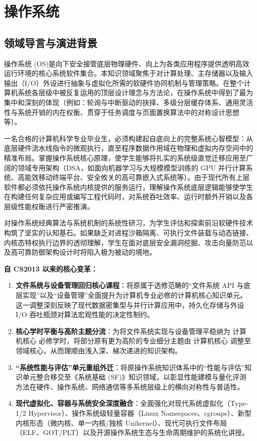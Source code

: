 \chapter{操作系统}

\section{领域导言与演进背景}

\begin{preamblebox}[知识领域概述与变革]
操作系统 (OS)是向下安全接管底层物理硬件、向上为各类应用程序提供透明高效运行环境的核心系统软件集合。本知识领域聚焦于对计算处理、主存储器以及输入输出（I/O）外设进行抽象与虚拟化所需的软硬件协同机制与管理策略。在整个计算机系统各层级中被反复运用的顶层设计理念与方法论，在操作系统中得到了最为集中和深刻的体现（例如：轮询与中断驱动的抉择、多级分层缓存体系、通用灵活性与系统开销的内在权衡、贯穿于任务调度与页面置换算法中的对称设计思想等）。

一名合格的计算机科学专业毕业生，必须构建起自底向上的完整系统心智模型：从底层硬件流水线指令的微观执行，直至程序数据作用域在物理和虚拟内存空间中的精准布局。掌握操作系统核心原理，使学生能够将扎实的系统级直觉迁移应用至广阔的领域专用架构（DSA，如面向机器学习与大规模模型训练的 GPU 并行计算系统、高能效移动终端平台、安全攸关的高可靠嵌入式系统等）。由于现代所有上层软件都必须依托操作系统内核提供的服务运行，理解操作系统底层逻辑能够使学生在构建任何复杂应用或编写工程代码时，对系统吞吐效率、运行时额外开销以及各层级性能权衡进行严密推演。

对操作系统经典算法与系统机制的系统性研习，为学生评估和探索前沿软硬件技术构筑了坚实的认知基石。如果缺乏对进程沙箱隔离、可执行文件装载与动态链接、内核态特权执行边界的透彻理解，学生在面对底层安全漏洞挖掘、攻击向量防范以及高可靠防御架构设计时将陷入极为被动的境地。

\textbf{自 CS2013 以来的核心变革：}
\begin{enumerate}
    \item \textbf{文件系统与设备管理回归核心课程}：将原属于选修范畴的“文件系统 API 与底层实现”以及“设备管理”全面提升为计算机专业必修的计算机核心知识单元。这一调整深刻反映了现代数据密集型与并行计算应用中，持久化存储与外设 I/O 吞吐瓶颈对算法宏观性能的决定性制约。
    \item \textbf{核心学时平衡与高阶主题分流}：为将文件系统实现与设备管理平稳纳为 计算机核心 必修学时，将部分原有更为高阶的专业细分主题由 计算机核心 调整至领域核心，从而理顺由浅入深、梯次递进的知识架构。
    \item \textbf{“系统性能与评估”单元重组外迁}：将原操作系统知识体系中的“性能与评估”知识单元整合移交至《系统基础 (SF)》知识领域，以彰显性能建模与量化评测方法在硬件、操作系统、网络通信等多系统层级上的横向对称性与普适性。
    \item \textbf{现代虚拟化、容器与系统安全深度融合}：全面强化对现代系统虚拟化（Type-1/2 Hypervisor）、操作系统级轻量容器（Linux Namespaces、cgroups）、新型内核形态（微内核、单一内核/独核 Unikernel）、现代可执行文件布局（ELF、GOT/PLT）以及开源操作系统生态与生命周期维护的系统化讲授。
\end{enumerate}
\end{preamblebox}

